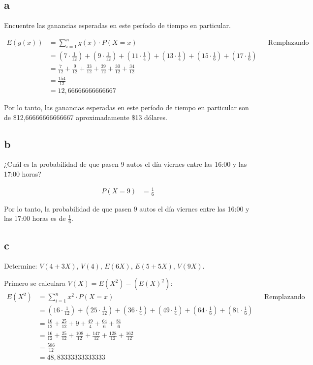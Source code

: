 \documentclass{templateNote}
\begin{document}
\newpage
\subsection{a}
Encuentre las ganancias esperadas en este período de tiempo en particular.

\begin{align*}
    E(g(x)) &= \displaystyle \sum_{i=1}^{n}{g(x) \cdot P(X=x)} && \text{Remplazando} \\
    &= (7 \cdot \frac{1}{12}) + (9 \cdot \frac{1}{12}) + (11 \cdot \frac{1}{4}) + (13 \cdot \frac{1}{4}) + (15 \cdot \frac{1}{6}) + (17 \cdot \frac{1}{6}) \\
    &= \frac{7}{12} + \frac{9}{12} + \frac{33}{12} + \frac{39}{12} + \frac{30}{12} + \frac{34}{12} \\
    &= \frac{154}{12} \\
    &= 12,66666666666667
\end{align*}

Por lo tanto, las ganancias esperadas en este período de tiempo en particular son de \$12,66666666666667 aproximadamente \$13 dólares.  

\subsection{b}
¿Cuál es la probabilidad de que pasen 9 autos el día viernes entre las 16:00 y las 17:00 horas?

\begin{align*}
    P(X=9) &= \frac{1}{6}
\end{align*}

Por lo tanto, la probabilidad de que pasen 9 autos el día viernes entre las 16:00 y las 17:00 horas es de $\frac{1}{6}$.

\subsection{c}
Determine: $V(4+3X)$, $V(4)$, $E(6X)$, $E(5+5X)$, $V(9X)$.

Primero se calculara $V(X) = E(X^2) - (E(X)^2)$:
\begin{align*}
    E(X^2) &= \sum_{i=1}^{n}{x^2 \cdot P(X=x)} && \text{Remplazando} \\
    &= (16 \cdot \frac{1}{12}) + (25 \cdot \frac{1}{12}) + (36 \cdot \frac{1}{4}) + (49 \cdot \frac{1}{4}) + (64 \cdot \frac{1}{6}) + (81 \cdot \frac{1}{6}) \\
    &= \frac{16}{12} + \frac{25}{12} + 9 + \frac{49}{4} + \frac{64}{6} + \frac{81}{6} \\
    &= \frac{16}{12} + \frac{25}{12} + \frac{108}{12} + \frac{147}{12} + \frac{128}{12} + \frac{162}{12} \\
    &= \frac{586}{12} \\
    &= 48,83333333333333
\end{align*}
\end{document}

